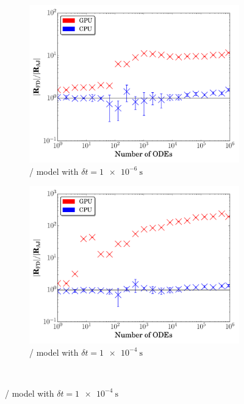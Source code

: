 \documentclass[preprint]{elsarticle}
\begin{document}
\begin{figure}[htb]
  \centering
  \begin{subfigure}{0.49\textwidth}
      \includegraphics[width=\linewidth]{H2_1e-06_ajac_comp.pdf}
      \caption{\slash{} model with $\delta t = \SI{1e-6}{\second}$}   
      \label{F:AJ_h2_small}
  \end{subfigure}
  \begin{subfigure}{0.49\textwidth}
      \includegraphics[width=\linewidth]{H2_1e-04_ajac_comp.pdf}
      \caption{\slash{} model with $\delta t = \SI{1e-4}{\second}$}
      \label{F:AJ_h2_large}
  \end{subfigure}
  \\

\end{figure}
\end{document}
